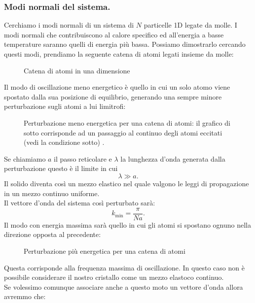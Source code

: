 \subsubsection{Modi normali del sistema.}%
\label{subsub:Modi normali del sistema.}
Cerchiamo i modi normali di un sistema di $N$ particelle 1D legate da molle. I modi normali che contribuiscono al calore specifico ed all'energia a basse temperature saranno quelli di energia più bassa.
Possiamo dimostrarlo cercando questi modi, prendiamo la seguente catena di atomi legati insieme da molle:
\begin{figure}[H]
    \centering
    \caption{Catena di atomi in una dimensione}
    \label{fig:catena-di-atomi-in-una-dimensione}
\end{figure}
\noindent
Il modo di oscillazione meno energetico è quello in cui un solo atomo viene spostato dalla sua posizione di equilibrio, generando una sempre minore perturbazione sugli atomi a lui limitrofi:
\begin{figure}[H]
    \centering
    \caption{\scriptsize Perturbazione meno energetica per una catena di atomi: il grafico di sotto corrisponde ad un passaggio al continuo degli atomi eccitati (vedi la condizione sotto) .}
    \label{fig:perturbazione-meno-energetica-per-una-catena-di-atomi}
\end{figure}
\noindent
Se chiamiamo $a$ il passo reticolare e $\lambda $ la lunghezza d'onda generata dalla perturbazione questo è il limite in cui 
\[
	\lambda \gg a
.\] 
Il solido diventa così un mezzo elastico nel quale valgono le leggi di propagazione in un mezzo continuo uniforme.\\
Il vettore d'onda del sistema così perturbato sarà:
\[
	k_{\text{min}} = \frac{\pi}{Na}
.\] 
Il modo con energia massima sarà quello in cui gli atomi si spostano ognuno nella direzione opposta al precedente:
\begin{figure}[H]
    \centering
    \caption{Perturbazione più energetica per una catena di atomi}
    \label{fig:perturbazione-più-energetica-per-una-catena-di-atomi}
\end{figure}
\noindent
Questa corrisponde alla frequenza massima di oscillazione. In questo caso non è possibile considerare il nostro cristallo come un mezzo elastoco continuo. \\
Se volessimo comunque associare anche a questo moto un vettore d'onda allora avremmo che:
